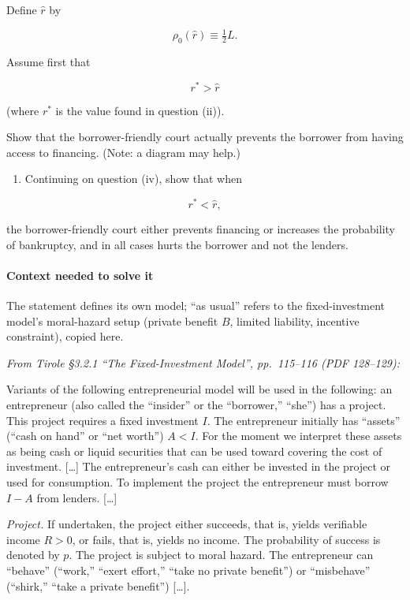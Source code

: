\documentclass[11pt,a4paper]{article}
\providecommand{\tightlist}{\setlength{\itemsep}{0pt}\setlength{\parskip}{0pt}}
\begin{document}
Define \(\hat r\) by

\[\rho_0(\hat r) \equiv \tfrac{1}{2}L.\]

Assume first that

\[r^* > \hat r\]

(where \(r^*\) is the value found in question (ii)).

Show that the borrower-friendly court actually prevents the borrower from having access to
financing. (Note: a diagram may help.)

\begin{enumerate}
\def\labelenumi{(\alph{enumi})}
\setcounter{enumi}{21}
\tightlist
\item
  Continuing on question (iv), show that when
\end{enumerate}

\[r^* < \hat r,\]

the borrower-friendly court either prevents financing or increases the probability of bankruptcy,
and in all cases hurts the borrower and not the lenders.

\paragraph{Context needed to solve it}

The statement defines its own model; ``as usual'' refers to the fixed-investment model's
moral-hazard setup (private benefit \(B\), limited liability, incentive constraint), copied here.

\emph{From Tirole §3.2.1 ``The Fixed-Investment Model'', pp.~115--116 (PDF 128--129):}

Variants of the following entrepreneurial model will be used in the following: an entrepreneur (also
called the ``insider'' or the ``borrower,'' ``she'') has a project. This project requires a fixed
investment \(I\). The entrepreneur initially has ``assets'' (``cash on hand'' or ``net worth'')
\(A < I\). For the moment we interpret these assets as being cash or liquid securities that can be
used toward covering the cost of investment. {[}\ldots{]} The entrepreneur's cash can either be
invested in the project or used for consumption. To implement the project the entrepreneur must
borrow \(I - A\) from lenders. {[}\ldots{]}

\emph{Project.} If undertaken, the project either succeeds, that is, yields verifiable income
\(R > 0\), or fails, that is, yields no income. The probability of success is denoted by \(p\). The
project is subject to moral hazard. The entrepreneur can ``behave'' (``work,'' ``exert effort,''
``take no private benefit'') or ``misbehave'' (``shirk,'' ``take a private benefit'') {[}\ldots{]}.
\end{document}
